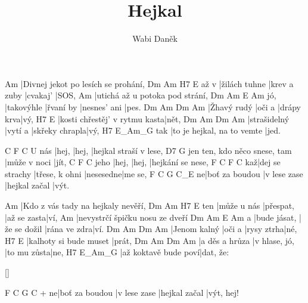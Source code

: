 \documentclass{song}
\title{Hejkal}
\author{Wabi Daněk}
\begin{document}
\strophe
Am
|Divnej jekot po lesích se prohání,
     Dm            Am           H7       E
až v |žilách tuhne |krev a zuby |cvakaj' |SOS,
Am
|utichá až u potoka pod strání,
    Dm         Am        E            Am
jó, |takovýhle |řvaní by |nesnes' ani |pes.
Dm          Am     Dm         Am
|Žhavý rudý |oči a |drápy krva|vý,
H7                            E
|kosti chřestěj' v rytmu kasta|nět,
Dm           Am      Dm             Am
|strašidelný |vytí a |skřeky chrapla|vý,
    H7                         E_Am_G
tak |to je hejkal, na to vemte |jed.
\endstrophe

      C     F     C
U nás |hej, |hej, |hejkal straší v lese,
                             D7          G
jen ten, kdo něco snese, tam |může v noci |jít,
     C     F     C
jeho |hej, |hej, |hejkání se nese,
   F               C              F         C
kaž|dej se strachy |třese, k ohni |nesesedne|me se,
  F              C            G             C_E
ne|boť za boudou |v lese zase |hejkal začal |výt.
\endstrophe

\strophe
Am
|Kdo z vás tady na hejkaly nevěří,
    Dm          Am        H7          E
ten |může u nás |přespat, |až se zasta|ví,
Am
|nevystrčí špičku nosu ze dveří
  Dm           Am           E            Am
a |bude jásat, |že se dožil |rána ve zdra|ví.
Dm           Am     Dm         Am
|Jenom kalný |oči a |rysy ztrha|né,
H7                    E
|kalhoty si bude muset |prát,
Dm             Am            Dm          Am
|a děs a hrůza |v hlase, jó, |to mu zůsta|ne,
H7                   E_Am_G
|až koktavě bude poví|dat, že:
\endstrophe

\ref{}

\strophe
    F              C            G             C
+ ne|boť za boudou |v lese zase |hejkal začal |výt, hej!
\endstrophe
\end{document}
